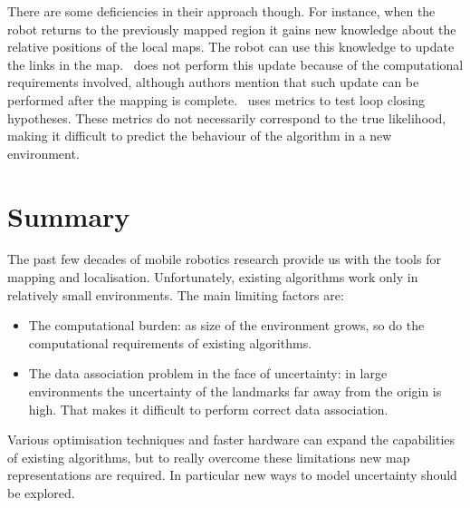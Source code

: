 There are some deficiencies in their approach though. For instance,
when the robot returns to the previously mapped region it gains new
knowledge about the relative positions of the local maps. The robot can
use this knowledge to update the links in the map. \Atlas\ does not
perform this update because of the computational requirements
involved, although authors mention that such update can be performed
after the mapping is complete. \Atlas\ uses metrics to test loop
closing hypotheses. These metrics do not necessarily correspond to the
true likelihood, making it difficult to predict the behaviour of the
algorithm in a new environment.

\section{Summary}


The past few decades of mobile robotics research provide us with
the tools for mapping and localisation. Unfortunately, existing
algorithms work only in relatively small environments. The main
limiting factors are:

\begin{itemize}
\item The computational burden: as size of the environment grows, so do
  the computational requirements of existing algorithms.

\item The data association problem in the face of uncertainty: 
   in large environments the uncertainty of the landmarks far away
  from the origin is high. That makes it difficult to perform correct
  data association.

\end{itemize}

Various optimisation techniques and faster hardware can expand the
capabilities of existing algorithms, but to really overcome these
limitations new map representations are required. In particular new
ways to model uncertainty should be explored. 





